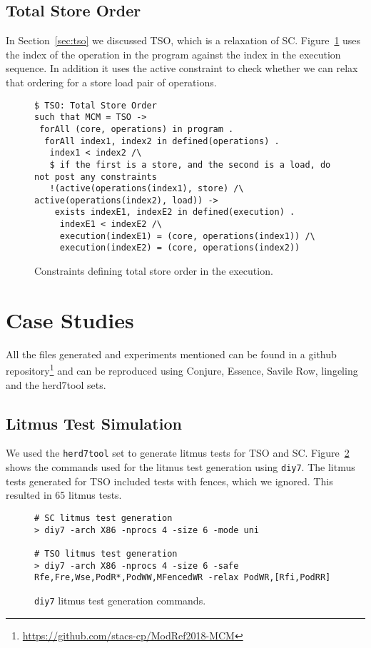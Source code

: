 \documentclass[runningheads]{llncs}
\begin{document}
\subsection{Total Store Order}
In Section~\ref{sec:tso} we discussed TSO, which is a relaxation of SC.
Figure~\ref{fig:essenceTSO} uses the index of the operation in the program against the index in the execution sequence.
In addition it uses the active constraint to check whether we can relax that ordering for a store load pair of operations.

\begin{figure}
\begin{lstlisting}
$ TSO: Total Store Order
such that MCM = TSO ->
 forAll (core, operations) in program .
  forAll index1, index2 in defined(operations) .
   index1 < index2 /\
   $ if the first is a store, and the second is a load, do not post any constraints
   !(active(operations(index1), store) /\ active(operations(index2), load)) ->
    exists indexE1, indexE2 in defined(execution) .
     indexE1 < indexE2 /\
     execution(indexE1) = (core, operations(index1)) /\
     execution(indexE2) = (core, operations(index2))
\end{lstlisting}
\caption{Constraints defining total store order in the execution.\label{fig:essenceTSO}}
\end{figure}



\section{Case Studies}
\label{sec:appl}
All the files generated and experiments mentioned can be found in a github repository\footnote{\url{https://github.com/stacs-cp/ModRef2018-MCM}} and can be reproduced using Conjure, Essence, Savile Row, lingeling and the herd7tool sets. 

\subsection{Litmus Test Simulation}
We used the {\tt{herd7tool}} set \cite{alglave2014} to generate litmus tests for TSO and SC.
Figure~\ref{fig:herd} shows the commands used for the litmus test generation using {\tt{diy7}}.
The litmus tests generated for TSO included tests with fences, which we ignored.
This resulted in 65 litmus tests.
\begin{figure}
\begin{lstlisting}
# SC litmus test generation
> diy7 -arch X86 -nprocs 4 -size 6 -mode uni

# TSO litmus test generation
> diy7 -arch X86 -nprocs 4 -size 6 -safe Rfe,Fre,Wse,PodR*,PodWW,MFencedWR -relax PodWR,[Rfi,PodRR]
\end{lstlisting}
\caption{{\tt{diy7}} litmus test generation commands.\label{fig:herd}}
\end{figure}
\end{document}
